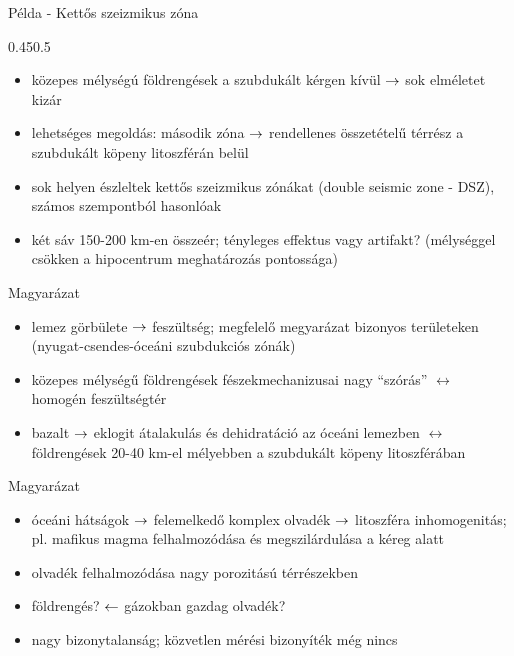 

\begin{frame}{Példa - Kettős szeizmikus zóna}
    \begin{figp}{}{}{0.45}{0.5}
        \begin{itemize}
            \item közepes mélységú földrengések a szubdukált kérgen kívül $\rightarrow$ sok elméletet kizár
            \item lehetséges megoldás: második zóna $\rightarrow$ rendellenes összetételű térrész a szubdukált köpeny litoszférán belül
            \item sok helyen észleltek kettős szeizmikus zónákat (double seismic zone - DSZ), számos szempontból hasonlóak
            \item két sáv 150-200 km-en összeér; tényleges effektus vagy artifakt? (mélységgel csökken a hipocentrum meghatározás pontossága)
        \end{itemize}
    \end{figp}
\end{frame}


\begin{frame}{Magyarázat}
    \begin{itemize}
        \item lemez görbülete $\rightarrow$ feszültség; megfelelő megyarázat bizonyos területeken (nyugat-csendes-óceáni szubdukciós zónák)
        \item közepes mélységű földrengések fészekmechanizusai nagy ``szórás'' $\leftrightarrow$ homogén feszültségtér
        \item bazalt $\rightarrow$ eklogit átalakulás és dehidratáció az óceáni lemezben $\leftrightarrow$ földrengések 20-40 km-el mélyebben a szubdukált köpeny litoszférában
    \end{itemize}
\end{frame}

\begin{frame}{Magyarázat}
    \begin{center}
    \begin{minipage}[c]{0.88\textwidth}
    \end{minipage}
    
    \begin{itemize}
        \item óceáni hátságok $\rightarrow$ felemelkedő komplex olvadék $\rightarrow$ litoszféra inhomogenitás; pl. mafikus magma felhalmozódása és megszilárdulása a kéreg alatt
        \item olvadék felhalmozódása nagy porozitású térrészekben
        \item földrengés? $\leftarrow$ gázokban gazdag olvadék?
        \item nagy bizonytalanság; közvetlen mérési bizonyíték még nincs
    \end{itemize}
    \end{center}
\end{frame}
